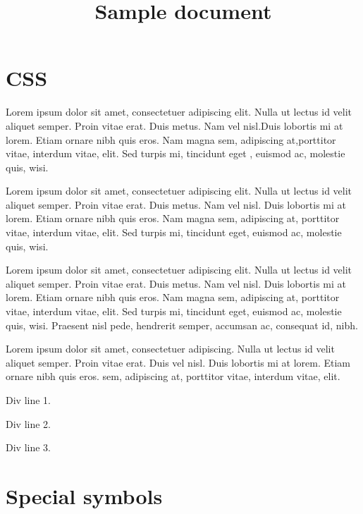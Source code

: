 \documentclass{article}
\title{Sample document}
\begin{document}
\maketitle

\section{CSS}

\par
Lorem ipsum dolor sit amet, consectetuer adipiscing elit.
 Nulla ut lectus id velit aliquet semper. Proin vitae erat. Duis metus. Nam
 vel nisl.Duis lobortis mi at lorem. Etiam ornare nibh quis eros. Nam magna 
sem, adipiscing at,porttitor vitae, interdum vitae, elit. Sed turpis mi,
 tincidunt eget , euismod ac, molestie quis, wisi.
  
\par
Lorem ipsum dolor sit amet, consectetuer adipiscing elit.
 Nulla ut lectus id velit aliquet semper. Proin vitae erat. Duis metus. Nam
 vel nisl. Duis lobortis mi at lorem. Etiam ornare nibh quis eros. Nam magna 
sem, adipiscing at, porttitor vitae, interdum vitae, elit. Sed turpis mi,
 tincidunt eget, euismod ac, molestie quis, wisi.
  
\par
Lorem ipsum dolor sit amet, consectetuer adipiscing elit.
 Nulla ut lectus id velit aliquet semper. Proin vitae erat. Duis metus. Nam
 vel nisl. Duis lobortis mi at lorem. Etiam ornare nibh quis eros. Nam magna 
sem, adipiscing at, porttitor vitae, interdum vitae, elit. Sed turpis mi,
 tincidunt eget, euismod ac, molestie quis, wisi. Praesent nisl pede,
 hendrerit semper, accumsan ac, consequat id, nibh.
\par
Lorem ipsum dolor sit amet, consectetuer adipiscing.
 Nulla ut lectus id velit aliquet semper. Proin vitae erat. Duis
 vel nisl. Duis lobortis mi at lorem. Etiam ornare nibh quis eros. 
sem, adipiscing at, porttitor vitae, interdum vitae, elit.

\par
Div line 1. 


\par
Div line 2. 


\par
Div line 3.

\section{Special symbols}
\end{document}
